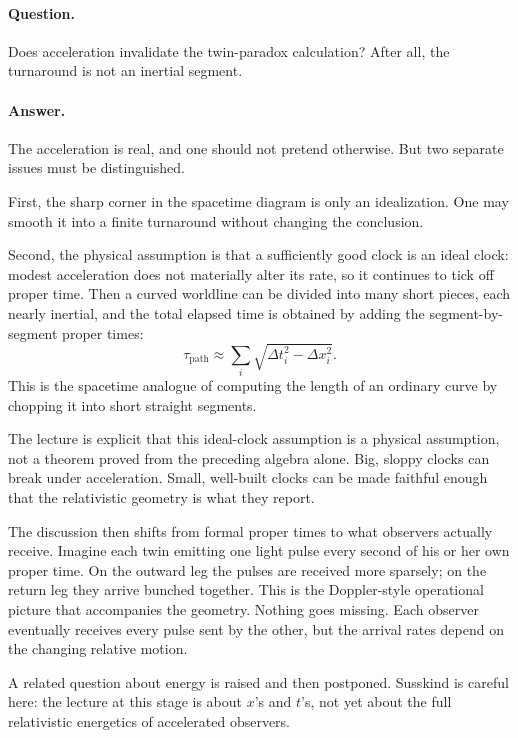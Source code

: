 \paragraph{Question.} Does acceleration invalidate the twin-paradox calculation? After all, the turnaround is not an inertial segment.

\paragraph{Answer.} The acceleration is real, and one should not pretend otherwise. But two separate issues must be distinguished.

First, the sharp corner in the spacetime diagram is only an idealization. One may smooth it into a finite turnaround without changing the conclusion.

Second, the physical assumption is that a sufficiently good clock is an ideal clock: modest acceleration does not materially alter its rate, so it continues to tick off proper time. Then a curved worldline can be divided into many short pieces, each nearly inertial, and the total elapsed time is obtained by adding the segment-by-segment proper times:
\begin{equation}
\tau_{\mathrm{path}} \approx \sum_i \sqrt{\Delta t_i^2-\Delta x_i^2}.
\end{equation}
This is the spacetime analogue of computing the length of an ordinary curve by chopping it into short straight segments.

The lecture is explicit that this ideal-clock assumption is a physical assumption, not a theorem proved from the preceding algebra alone. Big, sloppy clocks can break under acceleration. Small, well-built clocks can be made faithful enough that the relativistic geometry is what they report.

The discussion then shifts from formal proper times to what observers actually receive. Imagine each twin emitting one light pulse every second of his or her own proper time. On the outward leg the pulses are received more sparsely; on the return leg they arrive bunched together. This is the Doppler-style operational picture that accompanies the geometry. Nothing goes missing. Each observer eventually receives every pulse sent by the other, but the arrival rates depend on the changing relative motion.

A related question about energy is raised and then postponed. Susskind is careful here: the lecture at this stage is about \(x\)'s and \(t\)'s, not yet about the full relativistic energetics of accelerated observers.

